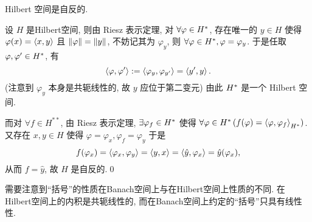 	\begin{Proposition}
		Hilbert 空间是自反的.
	\end{Proposition}
	\begin{Proof}
		设 $ H $ 是Hilbert空间, 则由 Riesz 表示定理, 对 $ \forall \varphi\in H^{*} $, 存在唯一的 $ y\in H $ 使得 $ \varphi(x)=\left\langle x, y \right\rangle $ 且 $ \left\| \varphi \right\|=\left\| y \right\| $, 不妨记其为 $ \varphi_{y} $, 则 $ \forall \varphi\in H^{*}, \varphi=\varphi_{y} $. 于是任取 $ \varphi, \varphi'\in H^{*} $, 有
		\[
			\left\langle \varphi, \varphi' \right\rangle:=\left\langle \varphi_{y}, \varphi_{y'} \right\rangle=\left\langle y', y \right\rangle.
		\]
		(注意到 $ \varphi_{y} $ 本身是共轭线性的, 故 $ y $ 应位于第二变元) 由此 $ H^{*} $ 是一个 Hilbert 空间.

		而对 $ \forall f\in H^{**} $, 由 Riesz 表示定理, $ \exists\varphi_{f}\in H^{*} $ 使得 $ \forall \varphi\in H^{*}\,(f(\varphi)=\left\langle \varphi, \varphi_{f} \right\rangle_{H^{*}}) $. 又存在 $ x, y\in H $ 使得 $ \varphi=\varphi_{x}, \varphi_{f}=\varphi_{y} $ 于是
		\[
			f(\varphi_{x})=\left\langle \varphi_{x}, \varphi_{y} \right\rangle=\left\langle y, x \right\rangle=\left\langle \hat{y}, \varphi_{x} \right\rangle=\hat{y}(\varphi_{x}),
		\]
		从而 $ f=\hat{y} $, 故 $ H $ 是自反的.\qed
	\end{Proof}
	
	需要注意到``括号''的性质在Banach空间上与在Hilbert空间上性质的不同. 在Hilbert空间上的内积是共轭线性的, 而在Banach空间上约定的``括号''只具有线性性.
	
